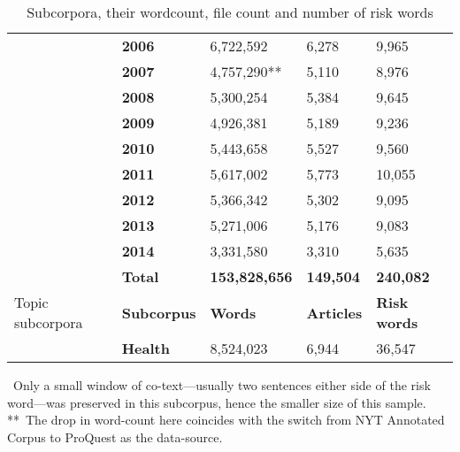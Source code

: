 \begin{table}
\begin{tabular}{p{1.5cm}|l|l|l|l|}
~ & \textbf{2006} & 6,722,592 & 6,278 &  9,965  \\ \cline{2-5}
~ & \textbf{2007} & 4,757,290** & 5,110 &  8,976  \\ \cline{2-5}
~ & \textbf{2008} & 5,300,254 & 5,384 &  9,645  \\ \cline{2-5}
~ & \textbf{2009} & 4,926,381 & 5,189 &  9,236  \\ \cline{2-5}
~ & \textbf{2010} & 5,443,658 & 5,527 &  9,560  \\ \cline{2-5}
~ & \textbf{2011} & 5,617,002 & 5,773 & 10,055  \\ \cline{2-5}
~ & \textbf{2012} & 5,366,342 & 5,302 &  9,095  \\ \cline{2-5}
~ & \textbf{2013} & 5,271,006 & 5,176 &  9,083  \\ \cline{2-5}
~ & \textbf{2014} & 3,331,580 & 3,310 &  5,635 \\ \cline{2-5}
~ & \textbf{Total} & \textbf{153,828,656} & \textbf{149,504} & \textbf{240,082} \\ \hline
\multicolumn{1}{|p{1.5cm}|}{Topic \mbox{subcorpora}} & \textbf{Subcorpus} & \textbf{Words} & \textbf{Articles} & \textbf{Risk words}   \\ \hline
~ & \textbf{Health}    & 8,524,023  & 6,944 & 36,547 \\ \cline{2-5}
\end{tabular}
    \caption{Subcorpora, their wordcount, file count and number of risk words}
    \label{tab:stats}
    \medskip %
\begin{minipage}{0.9\textwidth} %
{\footnotesize *~Only a small window of co-text---usually two sentences either side of the risk word---was preserved in this subcorpus, hence the smaller size of this sample.~\\
**~The drop in word-count here coincides with the switch from NYT Annotated Corpus to ProQuest as the data-source.\par}
\end{minipage}
\end{table}


